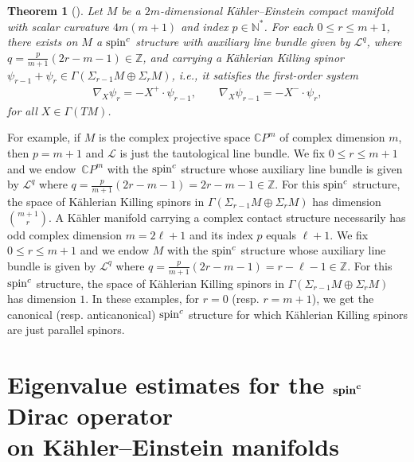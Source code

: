 \documentclass[10pt,a4paper]{amsart}
\numberwithin{equation}{section}
\newtheorem{thm}{Theorem}[section]
\theoremstyle{definition}
\begin{document}
\begin{thm}[] \label{KKSS}
Let $M$ be a $2m$-dimensional K\"ahler--Einstein compact mani\-fold with scalar
curvature $4m(m+1)$ and index $p \in  \mathbb N^*$. For each $0 \leq r \leq m+1$, there exists on $M$ a ${\mathop{\rm spin}^c}$ structure with auxiliary line bundle given by $\mathcal L^q$, where  $q = \frac{p}{m+1} (2r-m-1) \in \mathbb Z$, and carrying a K\"ahlerian Killing spinor $\psi_{r-1} + \psi_r \in \Gamma(\Sigma_{r-1} M \oplus \Sigma_{r} M)$, i.e.,  it satisfies the first-order system
\begin{gather*}
\nabla_X \psi_{r} = - X^+ \cdot \psi_{r-1},\qquad
\nabla_X \psi_{r-1}  = - X^-  \cdot \psi_{r},
\end{gather*}
for all $X \in \Gamma(TM)$.
\end{thm}


For example, if $M$ is the complex projective space $\mathbb C P^m$ of complex dimension $m$, then $p = m+1$ and $\mathcal L$ is just the tautological line bundle. We f\/ix $0 \leq r \leq m+1$ and we endow~$\mathbb C P^m$ with the ${\mathop{\rm spin}^c}$ structure whose auxiliary line bundle  is given by $\mathcal L^q$ where $q = \frac{p}{m+1} (2r-m-1) = 2r-m-1 \in \mathbb Z$. For this ${\mathop{\rm spin}^c}$ structure, the space of  K\"ahlerian Killing spinors   in $\Gamma(\Sigma_{r-1}M \oplus \Sigma_rM)$ has dimension $\binom{m+1}{r}$. A K\"ahler manifold carrying a complex contact structure necessarily has odd complex dimension $m = 2\ell+1$ and its index $p$ equals $\ell+1$.  We f\/ix $0 \leq r \leq m+1$ and we endow $M$ with the ${\mathop{\rm spin}^c}$ structure whose auxiliary line bundle is  given by $\mathcal L^q$ where $q = \frac{p}{m+1} (2r-m-1) = r-\ell-1 \in \mathbb Z$. For this ${\mathop{\rm spin}^c}$ structure, the space of  K\"ahlerian Killing spinors   in $\Gamma(\Sigma_{r-1} M\oplus \Sigma_{r}M)$ has dimension $1$.  In these examples, for $r=0$ (resp. $r = m+1$), we get the canonical (resp. anticanonical) ${\mathop{\rm spin}^c}$ structure for which K\"ahlerian Killing spinors are just parallel spinors.


\section[Eigenvalue estimates for the ${\mathop{\rm spin}^c}$ Dirac operator on K\"ahler--Einstein manifolds]{Eigenvalue estimates for the $\boldsymbol{{\mathop{\rm spin}^c}}$ Dirac operator\\ on K\"ahler--Einstein manifolds}\label{eigen}
\end{document}

